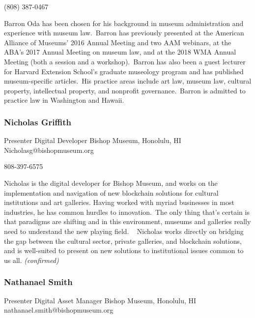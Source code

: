 \documentclass{report}
\begin{document}
              (808) 387-0467\newline

              Barron Oda has been chosen for his background in museum administration and experience with museum law. Barron has previously presented at the American Alliance of Museums’ 2016 Annual Meeting and two AAM webinars, at the ABA’s 2017 Annual Meeting on museum law, and at the 2018 WMA Annual Meeting (both a session and a workshop). Barron has also been a guest lecturer for Harvard Extension School’s graduate museology program and has published museum-specific articles. His practice areas include art law, museum law, cultural property, intellectual property, and nonprofit governance. Barron is admitted to practice law in Washington and Hawaii.\newline


              

              
                \subsubsection*{ Nicholas  Griffith }
                Presenter\newline
                Digital Developer\newline
                Bishop Museum, Honolulu, HI
                \newline
                Nicholasg@bishopmuseum.org\newline
                
                808-397-6575\newline

                Nicholas is the digital developer for Bishop Museum, and works on the implementation and navigation of new blockchain solutions for cultural institutions and art galleries. Having worked with myriad businesses in most industries, he has common hurdles to innovation. The only thing that’s certain is that paradigms are shifting and in this environment, museums and galleries really need to understand the new playing field. 
 
Nicholas works directly on bridging the gap between the cultural sector, private galleries, and blockchain solutions, and is well-suited to present on new solutions to institutional issues common to us all.
                \emph{ (confirmed) }
              

              
                \subsubsection*{ Nathanael  Smith }
                Presenter\newline
                Digital Asset Manager\newline
                Bishop Museum, Honolulu, HI
                \newline
                nathanael.smith@bishopmuseum.org\newline
                
\end{document}
